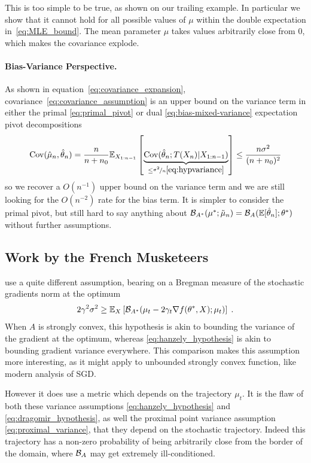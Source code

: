 \documentclass{article}
\newcommand*{\expect}[2][]{\ensuremath{\mathbb{E}_{#1} \left[ #2 \right] }} %
\newcommand{\logpart}{A}
\newcommand{\bregman}{\cB_\logpart}
\newcommand{\bregmanconj}{\cB_{\logpart^*}}
\newcommand{\nat}{\theta}
\newcommand{\lr}{\gamma} %
\newcommand{\MAPm}{\hat \mu_n}
\newcommand{\MAPt}{\hat \nat_n}
\begin{document}
This is too simple to be true, as shown on our trailing example.
In particular we show that it cannot hold for all possible values of $\mu$ within the double expectation in~\eqref{eq:MLE_bound}.
The mean parameter $\mu$ takes values arbitrarily close from $0$, which makes the covariance explode.

\paragraph{Bias-Variance Perspective.}
As shown in equation~\eqref{eq:covariance_expansion}, covariance~\eqref{eq:covariance_assumption} is an upper bound on the variance term in either the primal \eqref{eq:primal_pivot} or dual \eqref{eq:bias-mixed-variance} expectation pivot decompositions
\begin{align}
	\Cov(\MAPm, \MAPt)  = \frac{n}{n+n_0} \expect[X_{1:n-1}]{\underbrace{\Cov(\MAPt ; T(X_{n}) | X_{1:n-1} )}_{\leq \nicefrac{\sigma^2}{n} \eqref{eq:hypvariance}}}
	\leq  \frac{n \sigma^2}{(n+n_0)^2}
\end{align}
so we recover a $O(n^{-1})$ upper bound on the variance term and we are still looking for the $O(n^{-2})$ rate for the bias term. It is simpler to consider the primal pivot, but still hard to say anything about $\bregmanconj(\mu^* ; \tilde \mu_n) = \bregman(\E[\MAPt]; \nat^*)$ without further assumptions.

\subsection{Work by the French Musketeers}

\citet{dragomir2021fast} use a quite different assumption, bearing on a Bregman measure of the stochastic gradients norm at the optimum
\begin{align}
	2 \lr^2 \sigma^2
	\geq \expect[X]{\bregmanconj(\mu_t - 2 \lr_t \nabla f(\nat^*, X) ; \mu_t ) } \; .
	\label{eq:dragomir_hypothesis}
\end{align}
When $\logpart$ is strongly convex, this hypothesis is akin to bounding the variance of the gradient at the optimum, whereas \eqref{eq:hanzely_hypothesis} is akin to bounding gradient variance everywhere. This comparison makes this assumption more interesting, as it might apply to unbounded strongly convex function, like modern analysis of SGD. 

However it does use a metric which depends on the trajectory $\mu_t$. It is the flaw of both these variance assumptions \eqref{eq:hanzely_hypothesis} and \eqref{eq:dragomir_hypothesis}, as well the proximal point variance assumption \eqref{eq:proximal_variance}, that they depend on the stochastic trajectory. Indeed this trajectory has a non-zero probability of being arbitrarily close from the border of the domain, where $\bregman$ may get extremely ill-conditioned. 
\end{document}
